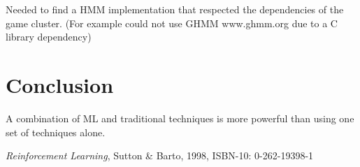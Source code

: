 \documentclass[11pt, oneside]{article}   	%
\begin{document}
Needed to find a HMM implementation that respected the dependencies of the game cluster. (For example could not use GHMM www.ghmm.org due to a C library dependency)

\section*{Conclusion}
A combination of ML and traditional techniques is more powerful than using one set of techniques alone.

\begin{thebibliography}{1}

 \emph{Reinforcement Learning}, Sutton \& Barto, 1998, ISBN-10: 0-262-19398-1
 
  \end{thebibliography}
\end{document}
